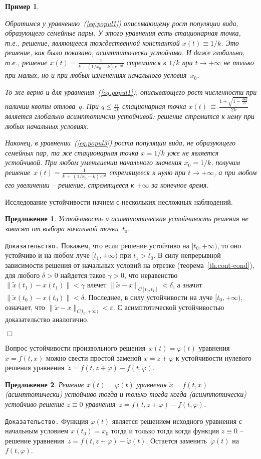 \documentclass[12pt,a4paper]{article}
\newtheorem{prop}{Предложение}
\newtheorem{ex}{Пример}
\begin{document}
\begin{ex}\label{ex.stab1}
{\em Обратимся у уравнению~(\ref{eq.popul1}) описывающему рост популяции вида, образующего семейные пары.
У этого уравнения есть стационарная точка, т.е., решение, являющееся тождественной константой $x(t) \equiv 1/k$.
Это решение, как было показано, асимптиточески устойчиво. И даже глобально, т.е., решение
$x(t) =  \frac{1}{k  + (1/x_0 - k)\, e^{-\alpha t}}$ стремится к $1/k$ при $t \to + \infty$ не только при малых, но и при любых изменениях начального  условия~$x_0$.

То же верно и для  уравнения~(\ref{eq.popul1}), описывающего рост численности при наличии квоты отлова~$q$.
     При $q \le  \frac{\alpha}{4k}$ стационарная точка $x(t)\, \equiv \, \frac{1 + \sqrt{1 - \frac{4kq}{\alpha}}}{2k}$
является глобально асимптотичски устойчивой: решение стремится к нему при любых начальных условиях.

Наконец, в уравнении~(\ref{eq.popul3}) роста популяции вида, не образующего семейных пар,
та же стационарная точка $x = 1/k$ уже не является устойчивой. При любом уменьшении начального значения $x_0 = 1/k$,
получим решение~$x(t) = \frac{1}{k \, + \, (1/x_0-k)\, e^{\alpha t}}$ стремящееся к нулю при $t \to +\infty$, а при любом его увеличении -- решение, стремящееся к $+\infty$ за конечное время.

}
\end{ex}
Исследование устойчивости начнем с нескольких несложных наблюдений.
\begin{prop}\label{p.stab1}
Устойчивость и асимптотическая устойчивость решения не зависят от выбора начальной точки~$t_0$.
\end{prop}
{\tt Доказательство.} Покажем, что если решение устойчиво на $[t_0, +\infty)$,
то оно устойчиво и на любом луче $[t_1, +\infty)$ при $t_1 > t_0$. В силу непрерывной зависимости
решения от начальных условий на отрезке (теорема~\ref{th.cont-cond}), для любого $\delta > 0$
найдется такое $\gamma > 0$, что неравенство $\|\tilde x(t_1) -  x(t_1)\| < \gamma$
влечет $\|\tilde x - x\|_{C[t_0, t_1]} < \delta$, а значит  $\|\tilde x(t_0) -  x(t_0)\| < \delta$.
Последнее,  в силу устойчивости на луче $[t_0, +\infty)$, означает, что $\|\tilde x - x\|_{C[t_0, +\infty)} < \varepsilon$.
С асимптотической устойчивостью доказательство аналогично.

   {\hfill $\Box$}
\bigskip

Вопрос устойчивости произвольного решения~$x(t) = \varphi (t)$ уравнения $\dot x = f(t, x)$
можно свести простой заменой
$x = z + \varphi$  к устойчивости нулевого решения уравнения~$\dot z = f(t, z + \varphi) - f(t, \varphi)$.
\begin{prop}\label{p.stab2}
Решение $x(t) = \varphi (t)$ уравнения $\dot x = f(t, x)$
(асимптотически) устойчиво тогда и только тогда когда (асимптотически) устойчиво решение $z\equiv 0$
 уравнения~$\dot z = f(t, z + \varphi) - f(t, \varphi)$.
\end{prop}
{\tt Доказательство.} Функция $\varphi(t)$ является решением исходного уравнения с начальным условием
$x(t_0) = x_0$ тогда и только тогда когда функция $z \equiv 0$ -- решение
уравнения~$\dot z = f(t, z + \varphi) - \dot \varphi(t)$. Остается заменить~$\dot \varphi (t)$ на $f(t, \varphi)$.
\end{document}
